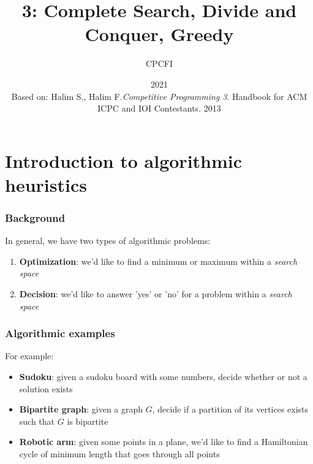 \documentclass{beamer}
\title{3: Complete Search, Divide and Conquer, Greedy}
\author{CPCFI}
\institute{UNAM's School of Engineering}
\date{2021 \\ \vspace{0.5cm} \scriptsize{Based on: Halim S., Halim F.\textit{Competitive Programming 3}}. Handbook for ACM ICPC and IOI Contestants. 2013}
\begin{document}
\frame{\titlepage}


\section{Introduction to algorithmic heuristics}
\begin{frame}[fragile]
\frametitle{Background}

In general, we have two types of algorithmic problems:
\begin{enumerate}
    \item \textbf{Optimization}: we'd like to find a minimum or maximum within a \textit{search space}
    \item \textbf{Decision}: we'd like to answer 'yes' or 'no' for a problem within a \textit{search space}
\end{enumerate}

\end{frame}


\begin{frame}[fragile]
\frametitle{Algorithmic examples}

For example:
\begin{itemize}
    \item \textbf{Sudoku}: given a sudoku board with some numbers, decide whether or not a solution exists
    \item \textbf{Bipartite graph}: given a graph $G$, decide if a partition of its vertices exists such that $G$ is bipartite
    \item \textbf{Robotic arm}: given some points in a plane, we'd like to find a Hamiltonian cycle of minimum length that goes through all points
\end{itemize}

\end{frame}
\end{document}
